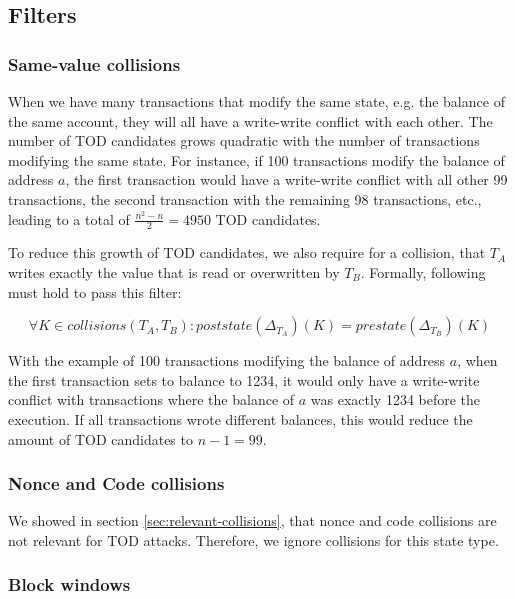 \documentclass[draft,final]{vutinfth} %
\begin{document}
\subsection{Filters}

\subsubsection{Same-value collisions}

When we have many transactions that modify the same state, e.g. the balance of the same account, they will all have a write-write conflict with each other. The number of TOD candidates grows quadratic with the number of transactions modifying the same state. For instance, if 100 transactions modify the balance of address $a$, the first transaction would have a write-write conflict with all other 99 transactions, the second transaction with the remaining 98 transactions, etc., leading to a total of $\frac{n^2-n}{2} = 4950$ TOD candidates.

To reduce this growth of TOD candidates, we also require for a collision, that $T_A$ writes exactly the value that is read or overwritten by $T_B$. Formally, following must hold to pass this filter:

$$\forall K \in collisions(T_A, T_B)\colon poststate(\Delta_{T_A})(K) = prestate(\Delta_{T_B})(K)$$

With the example of 100 transactions modifying the balance of address $a$, when the first transaction sets to balance to 1234, it would only have a write-write conflict with transactions where the balance of $a$ was exactly 1234 before the execution. If all transactions wrote different balances, this would reduce the amount of TOD candidates to $n-1 = 99$.

\subsubsection{Nonce and Code collisions}

We showed in section \ref{sec:relevant-collisions}, that nonce and code collisions are not relevant for TOD attacks. Therefore, we ignore collisions for this state type.

\subsubsection{Block windows}

\end{document}
